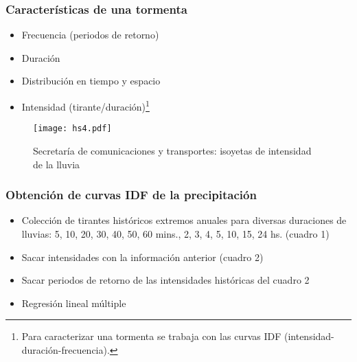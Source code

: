\subsubsection{Características de una tormenta}
\begin{itemize}
    \item Frecuencia (periodos de retorno)
    \item Duración
    \item Distribución en tiempo y espacio
    \item Intensidad (tirante/duración)\footnote{Para caracterizar una tormenta se trabaja con las curvas IDF (intensidad-duración-frecuencia).}
\end{itemize}
\begin{figure}[h!]
\centering
  \texttt{[image: hs4.pdf]}
  \caption{Secretaría de comunicaciones y transportes: isoyetas de intensidad de la lluvia}
  \label{hs4}
\end{figure}
\subsubsection{Obtención de curvas IDF de la precipitación}
\begin{itemize}
    \item Colección de tirantes históricos extremos anuales para diversas duraciones de lluvias: 5, 10, 20, 30, 40, 50, 60 mins., 2, 3, 4, 5, 10, 15, 24 hs. (cuadro 1)
    \item Sacar intensidades con la información anterior (cuadro 2)
    \item Sacar periodos de retorno de las intensidades históricas del cuadro 2
    \item Regresión lineal múltiple
\end{itemize}
